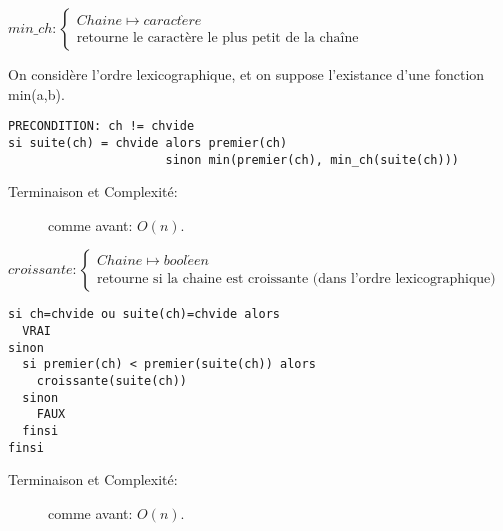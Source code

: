 \documentclass[10pt]{article}\usepackage[correction,nu]{esial}
\begin{document}
\begin{Question}
  $min\_ch: \left\{
    \begin{array}{l}
      Chaine\mapsto caract\grave{e}re\\
      \text{retourne le caractère le plus petit de la chaîne}
    \end{array}\right.$  
  
  \smallskip
  On considère l'ordre lexicographique, et on suppose l'existance d'une
  fonction min(a,b).
\end{Question}
\begin{Reponse}
  \begin{Verbatim}[label=min\_ch(ch)]
PRECONDITION: ch != chvide
si suite(ch) = chvide alors premier(ch)
                      sinon min(premier(ch), min_ch(suite(ch)))
  \end{Verbatim}

  \begin{description}
  \item[Terminaison et Complexité:] comme avant: $O(n)$. 
  \end{description}
\end{Reponse}

\begin{Question}
  $croissante: \left\{
    \begin{array}{l}
      Chaine\mapsto bool\acute{e}en\\
      \text{retourne si la chaine est croissante (dans l'ordre lexicographique)}
    \end{array}\right.$  
\end{Question}
\begin{Reponse}
  \begin{Verbatim}[label=croissante(ch)]
si ch=chvide ou suite(ch)=chvide alors
  VRAI
sinon
  si premier(ch) < premier(suite(ch)) alors
    croissante(suite(ch))
  sinon
    FAUX
  finsi
finsi
  \end{Verbatim}
  \begin{description}
  \item[Terminaison et Complexité:] comme avant: $O(n)$. 
  \end{description}
\end{Reponse}
\end{document}
